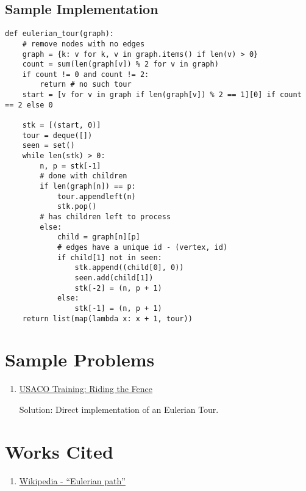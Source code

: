 \documentclass[11pt, oneside]{article}
\begin{document}
\subsection{Sample Implementation}

\begin{verbatim}
def eulerian_tour(graph):
    # remove nodes with no edges
    graph = {k: v for k, v in graph.items() if len(v) > 0}
    count = sum(len(graph[v]) % 2 for v in graph)
    if count != 0 and count != 2:
        return # no such tour
    start = [v for v in graph if len(graph[v]) % 2 == 1][0] if count == 2 else 0

    stk = [(start, 0)]
    tour = deque([])
    seen = set()
    while len(stk) > 0:
        n, p = stk[-1]
        # done with children
        if len(graph[n]) == p:
            tour.appendleft(n)
            stk.pop()
        # has children left to process
        else:
            child = graph[n][p]
            # edges have a unique id - (vertex, id)
            if child[1] not in seen:
                stk.append((child[0], 0))
                seen.add(child[1])
                stk[-2] = (n, p + 1)
            else:
                stk[-1] = (n, p + 1)
    return list(map(lambda x: x + 1, tour))
\end{verbatim}

\section{Sample Problems}

\begin{enumerate}
  \item \href{https://train.usaco.org/usacoprob2?a=TpH8RHs6Taa&S=fence}{USACO Training: Riding the Fence}

  Solution: Direct implementation of an Eulerian Tour.
\end{enumerate}

\section{Works Cited}

\begin{enumerate}
  \item \href{https://en.wikipedia.org/wiki/Eulerian_path}{Wikipedia - ``Eulerian path''}
\end{enumerate}
\end{document}
